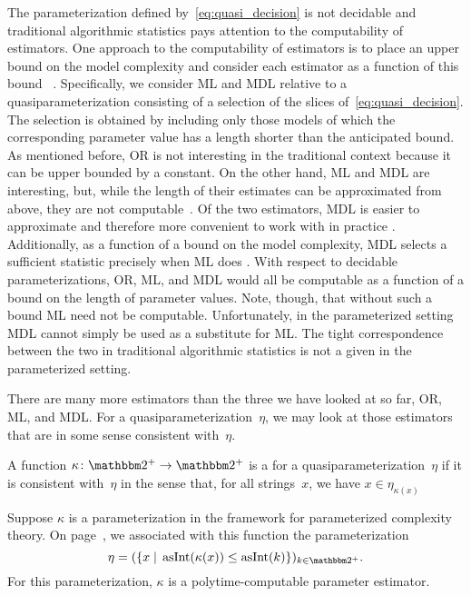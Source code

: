The parameterization defined by~\eqref{eq:quasi_decision} is not decidable and traditional algorithmic statistics pays attention to the computability of estimators.
One approach to the computability of estimators is to place an upper bound on the model complexity and consider each estimator as a function of this bound~\parencite{gacs2001algorithmic,vereshchagin2004kolmogorov} \parencite[in the presence of resource bounds,][]{milovanov2017algorithmic}.
Specifically, we consider ML and MDL relative to a quasiparameterization consisting of a selection of the slices of~\eqref{eq:quasi_decision}.
The selection is obtained by including only those models of which the corresponding parameter value has a length shorter than the anticipated bound.
As mentioned before, OR is not interesting in the traditional context because it can be upper bounded by a constant.
On the other hand, ML and MDL are interesting, but, while the length of their estimates can be approximated from above, they are not computable~\parencite{vereshchagin2004kolmogorov}.
Of the two estimators, MDL is easier to approximate and therefore more convenient to work with in practice \parencite[Section~V.B]{vereshchagin2004kolmogorov}.
Additionally, as a function of a bound on the model complexity, MDL selects a sufficient statistic precisely when ML does \parencite[Lemma~IV.2]{vereshchagin2004kolmogorov}.
With respect to decidable parameterizations, OR, ML, and MDL would all be computable as a function of a bound on the length of parameter values.
Note, though, that without such a bound ML need not be computable.
Unfortunately, in the parameterized setting MDL cannot simply be used as a substitute for ML.
The tight correspondence between the two in traditional algorithmic statistics is not a given in the parameterized setting.

There are many more estimators than the three we have looked at so far, OR, ML, and MDL.
For a quasiparameterization~$\eta$, we may look at those estimators that are in some sense consistent with~$\eta$.
\begin{definition}
  A function $\kappa\colon \binary^+ \to \binary^+$ is a  for a quasiparameterization~$\eta$ if it is consistent with~$\eta$ in the sense that, for all strings~$x$, we have $x \in \eta_{\kappa(x)}$
\end{definition}
\begin{example}
  Suppose $\kappa$ is a parameterization in the \citeauthor{flum2006parameterized} framework for parameterized complexity theory.
  On page~\pageref{eq:flum_parameterization}, we associated with this function the parameterization
  \begin{equation*}
    \eta \deq (\{x \st \asNat(\kappa(x)) \le \asNat(k)\})_{k \in \binary^+}.
  \end{equation*}
  For this parameterization, $\kappa$ is a polytime-computable parameter estimator.
\end{example}

